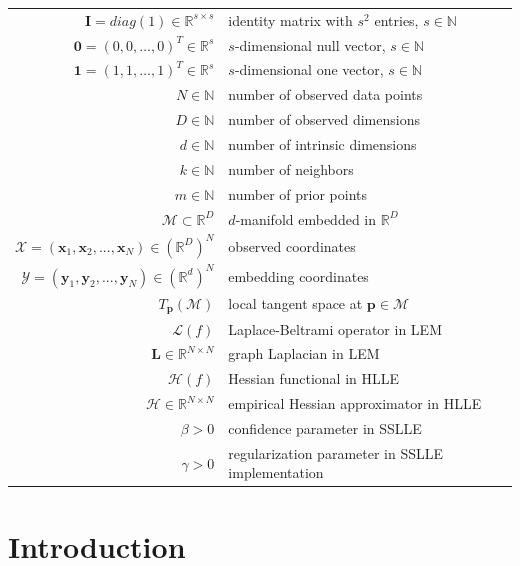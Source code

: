 \documentclass[12pt, t]{article}
\newcommand{\mani}{\mathcal{M}}
\newcommand{\N}{\mathbb{N}}
\newcommand{\R}{\mathbb{R}}
\newcommand{\RD}{\mathbb{R}^D}
\newcommand{\Rd}{\mathbb{R}^d}
\newcommand{\X}{\mathcal{X}}
\newcommand{\x}{\bm{x}}
\newcommand{\Y}{\mathcal{Y}}
\newcommand{\pv}{\bm{p}}
\newcommand{\I}{\bm{I}}
\newcommand{\Lap}{\bm{L}}
\begin{document}
\begin{tabular}{rl}
  $\I = \mathit{diag}(1) \in \R^{s \times s}$ & identity matrix with $s^2$ 
  entries, $s \in \N$ \\
  $\bm{0} = (0, 0, \dots, 0)^T \in \R^s$ & $s$-dimensional null vector, 
  $s \in \N$ \\
  $\bm{1} = (1, 1, \dots, 1)^T \in \R^s$ & $s$-dimensional one vector, 
  $s \in \N$ \\
  $N \in \N$ & number of observed data points \\
  $D \in \N$ & number of observed dimensions \\
  $d \in \N$ & number of intrinsic dimensions\\
  $k \in \N$ & number of neighbors \\
  $m \in \N$ & number of prior points \\
  $\mani \subset \RD$ & $d$-manifold embedded in $\RD$ \\
  $\X = (\bm{x}_1, \bm{x}_2, ..., \bm{x}_N) \in (\RD)^N$ & observed
  coordinates \\
  $\Y = (\bm{y}_1, \bm{y}_2, ..., \bm{y}_N) \in (\Rd)^N$ & embedding
  coordinates \\
  $T_{\pv}(\mani)$ & local tangent space at $\pv \in \mani$ \\
  $\mathcal{L}(f)$ & Laplace-Beltrami operator in LEM \\
  $\Lap\in \R^{N \times N}$ & graph Laplacian in LEM \\
  $\mathscr{H}(f)$ & Hessian functional in HLLE \\
  $\mathcal{H} \in \R^{N \times N}$ & empirical Hessian approximator in HLLE \\
  $\beta > 0$ & confidence parameter in SSLLE \\
  $\gamma > 0$ & regularization parameter in SSLLE implementation
\end{tabular}

\newpage


    
\section{Introduction}
\label{intro}

\end{document}
